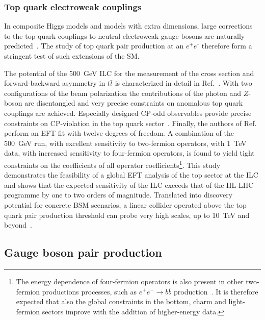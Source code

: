 \subsubsection{Top quark electroweak couplings}
\label{subsubsec:highE:topelectroweak}

In composite Higgs models and models with extra dimensions, large corrections to the top quark couplings to
neutral electroweak gauge bosons are naturally predicted~\cite{Richard:2014upa,Barducci:2015aoa,Durieux:2018ekg}.
The study of top quark pair production at an $e^+e⁻$ therefore form a stringent test of such extensions of the SM.

The potential of the 500~GeV{} ILC for the measurement of the cross section and forward-backward asymmetry in
$t\bar{t}$ is characterized in detail in Ref.~\cite{Amjad:2015mma}. With two configurations of the beam polarization
the contributions of the photon and $Z$-boson are disentangled and very precise constraints on anomalous top quark
couplings are achieved. Especially designed CP-odd observables provide precise constraints on CP-violation in the
top quark sector~\cite{Bernreuther:2017cyi}. Finally, the authors of Ref.~\cite{Durieux:2018tev} perform an EFT fit
with twelve degrees of freedom. A combination of the 500~GeV run, with excellent sensitivity to two-fermion operators,
with 1~TeV{} data, with increased sensitivity to four-fermion operators, is found to yield tight constraints on the
coefficients of all operator coefficients\footnote{The energy dependence of four-fermion operators is also present in
other two-fermion productions processes, such as $e^+e^- \rightarrow b\bar{b}$ production~\cite{Bilokin:2017lco}. It is
therefore expected that also the global constraints in the bottom, charm and light-fermion sectors improve with the addition
of higher-energy data.}. This study demonstrates the feasibility of a global EFT analysis of the top sector
at the ILC and shows that the expected sensitivity of the ILC exceeds that of the HL-LHC programme by one to two orders of
magnitude. Translated into discovery potential for concrete BSM scenarios, a linear collider operated above the top quark
pair production threshold can probe very high scales, up to 10~TeV and beyond~\cite{Durieux:2018ekg}. 

\subsection{Gauge boson pair production}
\label{subsec:highE:gauge}


